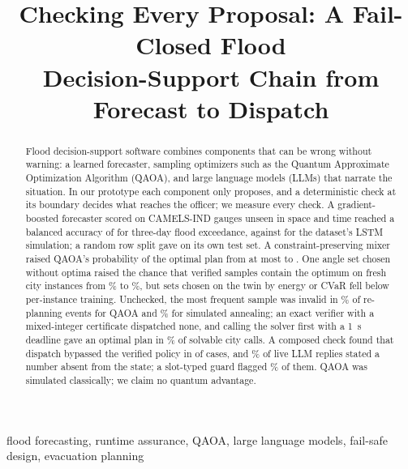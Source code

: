 \documentclass[conference]{IEEEtran}
\begin{document}
\title{Checking Every Proposal: A Fail-Closed Flood\\
Decision-Support Chain from Forecast to Dispatch}

\author{
}

\maketitle

\begin{abstract}
Flood decision-support software combines components that can be wrong without warning: a learned forecaster, sampling optimizers such as the Quantum Approximate Optimization Algorithm (QAOA), and large language models (LLMs) that narrate the situation. In our prototype each component only proposes, and a deterministic check at its boundary decides what reaches the officer; we measure every check. A gradient-boosted forecaster scored on CAMELS-IND gauges unseen in space and time reached a balanced accuracy of \FcXgbBA{} for three-day flood exceedance, against \FcLstmBA{} for the dataset's LSTM simulation; a random row split gave \FcLeakRandBA{} on its own test set. A constraint-preserving mixer raised QAOA's probability of the optimal plan from at most \QaSeedXMax{} to \QaSeedXYMean. One angle set chosen without optima raised the chance that \QaShots{} verified samples contain the optimum on fresh city instances from \QaFrTrainedSucc\% to \QaFrSetSucc\%, but sets chosen on the twin by energy or CVaR fell below per-instance training. Unchecked, the most frequent sample was invalid in \RaTwinRawQ\% of re-planning events for QAOA and \RaTwinRawSA\% for simulated annealing; an exact verifier with a mixed-integer certificate dispatched none, and calling the solver first with a 1~s deadline gave an optimal plan in \RaDfOptOne\% of solvable city calls. A composed check found that dispatch bypassed the verified policy in \AgEtoEViolBefore{} of \AgEtoECases{} cases, and \AgLiveUnsupPct\% of \AgLiveN{} live LLM replies stated a number absent from the state; a slot-typed guard flagged \AgLiveTypRec\% of them. QAOA was simulated classically; we claim no quantum advantage.
\end{abstract}

\begin{IEEEkeywords}
flood forecasting, runtime assurance, QAOA, large language models, fail-safe design, evacuation planning
\end{IEEEkeywords}
\end{document}
